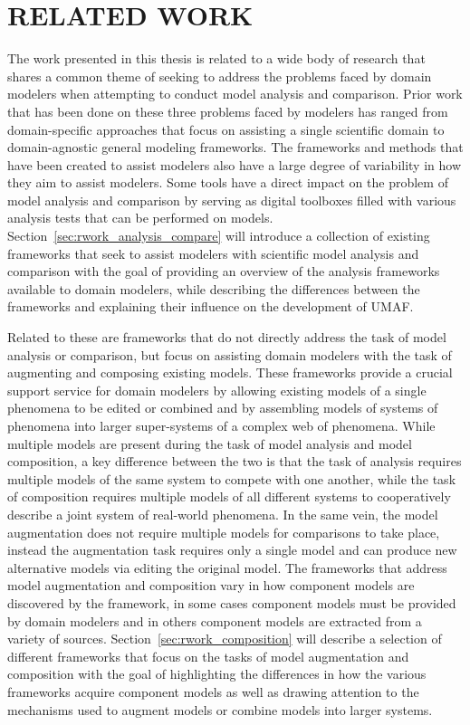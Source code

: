 \chapter{RELATED WORK\label{chapter:related_work}}
The work presented in this thesis is related to a wide body of research that shares a common theme of seeking to address the problems faced by domain modelers when attempting to conduct model analysis and comparison.
Prior work that has been done on these three problems faced by modelers has ranged from domain-specific approaches that focus on assisting a single scientific domain to domain-agnostic general modeling frameworks.
The frameworks and methods that have been created to assist modelers also have a large degree of variability in how they aim to assist modelers.
Some tools have a direct impact on the problem of model analysis and comparison by serving as digital toolboxes filled with various analysis tests that can be performed on models.
Section~\ref{sec:rwork_analysis_compare} will introduce a collection of existing frameworks that seek to assist modelers with scientific model analysis and comparison with the goal of providing an overview of the analysis frameworks available to domain modelers, while describing the differences between the frameworks and explaining their influence on the development of UMAF.

Related to these are frameworks that do not directly address the task of model analysis or comparison, but focus on assisting domain modelers with the task of augmenting and composing existing models.
These frameworks provide a crucial support service for domain modelers by allowing existing models of a single phenomena to be edited or combined and by assembling models of systems of phenomena into larger super-systems of a complex web of phenomena.
While multiple models are present during the task of model analysis and model composition, a key difference between the two is that the task of analysis requires multiple models of the same system to compete with one another, while the task of composition requires multiple models of all different systems to cooperatively describe a joint system of real-world phenomena.
In the same vein, the model augmentation does not require multiple models for comparisons to take place, instead the augmentation task requires only a single model and can produce new alternative models via editing the original model.
The frameworks that address model augmentation and composition vary in how component models are discovered by the framework, in some cases component models must be provided by domain modelers and in others component models are extracted from a variety of sources.
Section~\ref{sec:rwork_composition} will describe a selection of different frameworks that focus on the tasks of model augmentation and composition with the goal of highlighting the differences in how the various frameworks acquire component models as well as drawing attention to the mechanisms used to augment models or combine models into larger systems.

